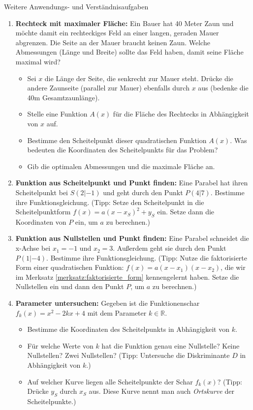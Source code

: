 \begin{aufgabenumgebung}{Weitere Anwendungs- und Verständnisaufgaben}
\begin{enumerate}
    \item \textbf{Rechteck mit maximaler Fläche:} Ein Bauer hat 40 Meter Zaun und möchte damit ein rechteckiges Feld an einer langen, geraden Mauer abgrenzen. Die Seite an der Mauer braucht keinen Zaun. Welche Abmessungen (Länge und Breite) sollte das Feld haben, damit seine Fläche maximal wird?
        \begin{itemize}
            \item Sei $x$ die Länge der Seite, die senkrecht zur Mauer steht. Drücke die andere Zaunseite (parallel zur Mauer) ebenfalls durch $x$ aus (bedenke die 40m Gesamtzaunlänge).
            \item Stelle eine Funktion $A(x)$ für die Fläche des Rechtecks in Abhängigkeit von $x$ auf.
            \item Bestimme den Scheitelpunkt dieser quadratischen Funktion $A(x)$. Was bedeuten die Koordinaten des Scheitelpunkts für das Problem?
            \item Gib die optimalen Abmessungen und die maximale Fläche an.
        \end{itemize}
    \item \textbf{Funktion aus Scheitelpunkt und Punkt finden:} Eine Parabel hat ihren Scheitelpunkt bei $S(2|-1)$ und geht durch den Punkt $P(4|7)$. Bestimme ihre Funktionsgleichung. (Tipp: Setze den Scheitelpunkt in die Scheitelpunktform $f(x)=a(x-x_S)^2+y_S$ ein. Setze dann die Koordinaten von $P$ ein, um $a$ zu berechnen.)
    \item \textbf{Funktion aus Nullstellen und Punkt finden:} Eine Parabel schneidet die x-Achse bei $x_1=-1$ und $x_2=3$. Außerdem geht sie durch den Punkt $P(1|-4)$. Bestimme ihre Funktionsgleichung. (Tipp: Nutze die faktorisierte Form einer quadratischen Funktion: $f(x)=a(x-x_1)(x-x_2)$, die wir im Merksatz \ref{merksatz:faktorisierte_form} kennengelernt haben. Setze die Nullstellen ein und dann den Punkt $P$, um $a$ zu berechnen.)
    \item \textbf{Parameter untersuchen:} Gegeben ist die Funktionenschar $f_k(x) = x^2 - 2kx + 4$ mit dem Parameter $k \in \mathbb{R}$.
        \begin{itemize}
            \item Bestimme die Koordinaten des Scheitelpunkts in Abhängigkeit von $k$.
            \item Für welche Werte von $k$ hat die Funktion genau eine Nullstelle? Keine Nullstellen? Zwei Nullstellen? (Tipp: Untersuche die Diskriminante $D$ in Abhängigkeit von $k$.)
            \item Auf welcher Kurve liegen alle Scheitelpunkte der Schar $f_k(x)$? (Tipp: Drücke $y_S$ durch $x_S$ aus. Diese Kurve nennt man auch \textit{Ortskurve} der Scheitelpunkte.)
        \end{itemize}
\end{enumerate}
\end{aufgabenumgebung}


